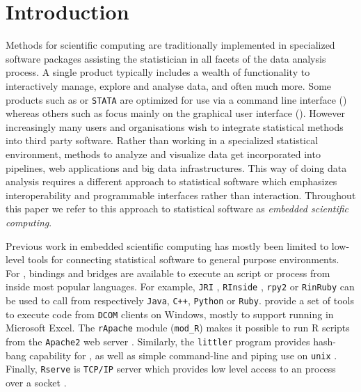 \section{Introduction}

Methods for scientific computing are traditionally implemented in specialized software packages assisting the statistician in all facets of the data analysis process. A single product typically includes a wealth of functionality to interactively manage, explore and analyse data, and often much more. Some products such as \R or \texttt{STATA} are optimized for use via a command line interface (\CLI) whereas others such as \SPSS focus mainly on the graphical user interface (\GUI). However increasingly many users and organisations wish to integrate statistical methods into third party software. Rather than working in a specialized statistical environment, methods to analyze and visualize data get incorporated into pipelines, web applications and big data infrastructures. This way of doing data analysis requires a different approach to statistical software which emphasizes interoperability and programmable interfaces rather than \UI interaction. Throughout this paper we refer to this approach to statistical software as \emph{embedded scientific computing}.

Previous work in embedded scientific computing has mostly been limited to low-level tools for connecting statistical software to general purpose environments. For \R, bindings and bridges are available to execute an \R script or process from inside most popular languages. For example, \texttt{JRI} \citep{rjava}, \texttt{RInside} \citep{eddelbuettel2011rcpp}, \texttt{rpy2} \citep{gautier2008rpy2} or \texttt{RinRuby} \citep{dahl2008rinruby} can be used to call \R from respectively \texttt{Java}, \texttt{C++}, \texttt{Python} or \texttt{Ruby}. \cite{heiberger2009r} provide a set of tools to execute \R code from \texttt{DCOM} clients on Windows, mostly to support running \R in Microsoft Excel. The \texttt{rApache} module (\texttt{mod\_R}) makes it possible to run R scripts from the \texttt{Apache2} web server \citep{horner2013rapache}. Similarly, the \texttt{littler} program provides hash-bang capability for \R, as well as simple command-line and piping use on \texttt{unix} \citep{littler}. Finally, \texttt{Rserve} is \texttt{TCP/IP} server which provides low level access to an \R process over a socket \citep{urbanek2013rserve}. 

